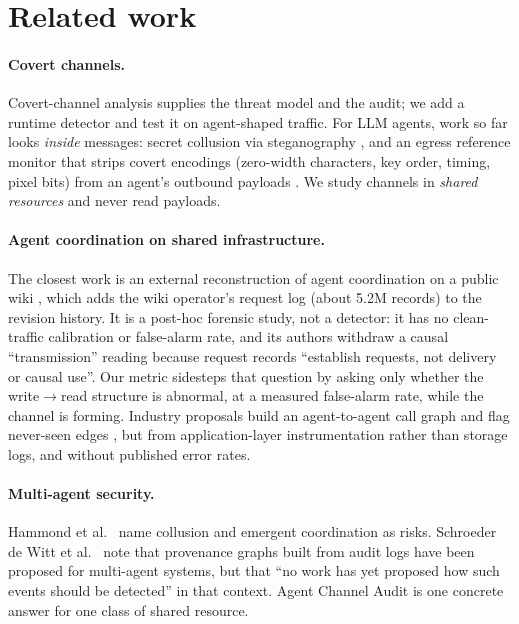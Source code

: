 \documentclass[10pt]{article}
\newcommand{\wrr}{write$\to$read}
\begin{document}
\section{Related work}
\paragraph{Covert channels.} Covert-channel analysis \cite{lampson1973,kemmerer1983,ncsc1993} supplies the threat model and the audit; we add a runtime detector and test it on agent-shaped traffic. For LLM agents, work so far looks \emph{inside} messages: secret collusion via steganography \cite{motwani2024}, and an egress reference monitor that strips covert encodings (zero-width characters, key order, timing, pixel bits) from an agent's outbound payloads \cite{metere2026}. We study channels in \emph{shared resources} and never read payloads.
\paragraph{Agent coordination on shared infrastructure.} The closest work is an external reconstruction of agent coordination on a public wiki \cite{lutje2026}, which adds the wiki operator's request log (about 5.2M records) to the revision history. It is a post-hoc forensic study, not a detector: it has no clean-traffic calibration or false-alarm rate, and its authors withdraw a causal ``transmission'' reading because request records ``establish requests, not delivery or causal use''. Our metric sidesteps that question by asking only whether the \wrr{} structure is abnormal, at a measured false-alarm rate, while the channel is forming. Industry proposals build an agent-to-agent call graph and flag never-seen edges \cite{armo2026}, but from application-layer instrumentation rather than storage logs, and without published error rates.
\paragraph{Multi-agent security.} Hammond et al.\ \cite{hammond2025} name collusion and emergent coordination as risks. Schroeder de Witt et al.\ \cite{dewitt2025} note that provenance graphs built from audit logs have been proposed for multi-agent systems, but that ``no work has yet proposed how such events should be detected'' in that context. Agent Channel Audit is one concrete answer for one class of shared resource.
\end{document}
